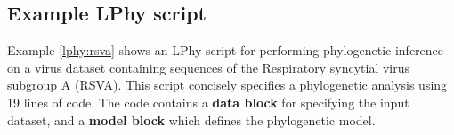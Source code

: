 \documentclass[10pt,letterpaper,table]{article}
\begin{document}


\subsection{Example LPhy script}

Example \ref{lphy:rsva} shows an LPhy script for performing phylogenetic inference on a virus dataset containing sequences of the Respiratory syncytial virus subgroup A (RSVA). 
This script concisely specifies a phylogenetic analysis using 19 lines of code.  
The code contains a \textbf{data block} for specifying the input dataset, and a \textbf{model block} which defines the phylogenetic model. 
\end{document}
